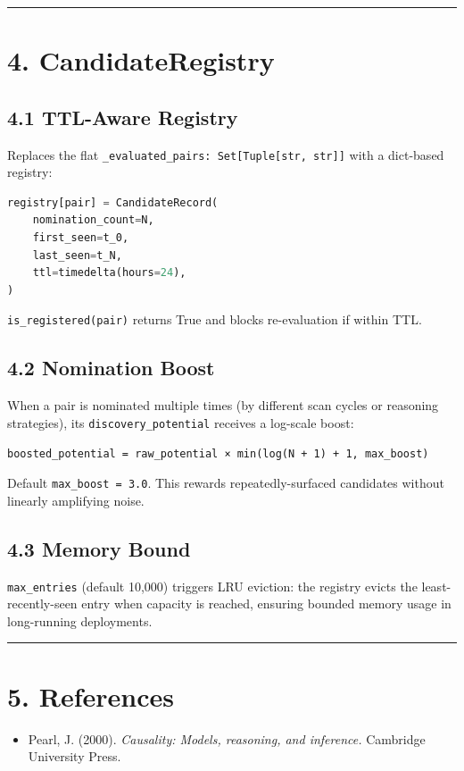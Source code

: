 \medskip\noindent\rule{\linewidth}{0.4pt}\medskip

\section*{4. CandidateRegistry}

\subsection*{4.1 TTL-Aware Registry}

Replaces the flat \texttt{\_evaluated\_pairs: Set[Tuple[str, str]]} with a dict-based registry:

\begin{lstlisting}[language=Python]
registry[pair] = CandidateRecord(
    nomination_count=N,
    first_seen=t_0,
    last_seen=t_N,
    ttl=timedelta(hours=24),
)
\end{lstlisting}

\texttt{is\_registered(pair)} returns True and blocks re-evaluation if within TTL.

\subsection*{4.2 Nomination Boost}

When a pair is nominated multiple times (by different scan cycles or reasoning strategies), its \texttt{discovery\_potential} receives a log-scale boost:

\begin{lstlisting}
boosted_potential = raw_potential × min(log(N + 1) + 1, max_boost)
\end{lstlisting}

Default \texttt{max\_boost = 3.0}. This rewards repeatedly-surfaced candidates without linearly amplifying noise.

\subsection*{4.3 Memory Bound}

\texttt{max\_entries} (default 10,000) triggers LRU eviction: the registry evicts the least-recently-seen entry when capacity is reached, ensuring bounded memory usage in long-running deployments.

\medskip\noindent\rule{\linewidth}{0.4pt}\medskip

\section*{5. References}

\begin{itemize}
  \item [pearl2000causality] Pearl, J. (2000). \textit{Causality: Models, reasoning, and inference.} Cambridge University Press.
\end{itemize}
